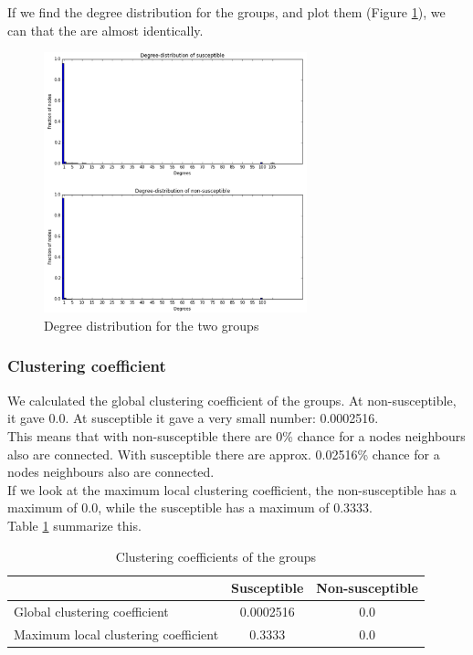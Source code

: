 \documentclass[10pt]{IEEEtran}
\begin{document}
If we find the degree distribution for the groups, and plot them (Figure \ref{fig:degree_distribution}), we can that the are almost identically. 
\begin{figure}[H]
  \centering
  \includegraphics[width=3.0in]{degree_distribution}
  \caption{Degree distribution for the two groups}
  \label{fig:degree_distribution}
\end{figure}


\subsubsection{Clustering coefficient}
We calculated the global clustering coefficient of the groups. At non-susceptible, it gave 0.0. At susceptible it gave a very small number: 0.0002516.\\

This means that with non-susceptible there are 0\% chance for a nodes neighbours also are connected. 
With susceptible there are approx. 0.02516\% chance for a nodes neighbours also are connected. \\
If we look at the maximum local clustering coefficient, the non-susceptible has a maximum of 0.0, while the susceptible has a maximum of 0.3333. \\
Table \ref{tab:clustering_coefficient} summarize this. 
\begin{table}[H]
\centering
\begin{tabular}{lcc}
\hline
                      & Susceptible & Non-susceptible \\ \hline
Global clustering coefficient & 0.0002516 & 0.0           \\
Maximum local clustering coefficient          & 0.3333        & 0.0     \\ \hline
\end{tabular}
\caption{Clustering coefficients of the groups}
\label{tab:clustering_coefficient}
\end{table}
\end{document}
